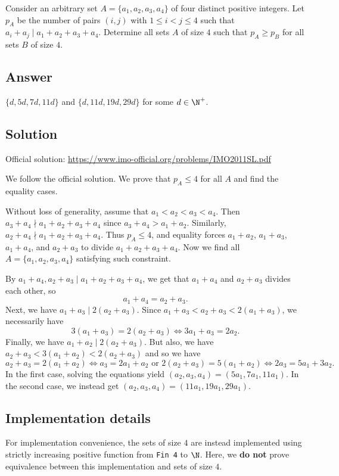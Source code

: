 Consider an arbitrary set $A = \{a_1, a_2, a_3, a_4\}$ of four distinct positive integers.
Let $p_A$ be the number of pairs $(i, j)$ with $1 \leq i < j \leq 4$ such that $a_i + a_j \mid a_1 + a_2 + a_3 + a_4$.
Determine all sets $A$ of size $4$ such that $p_A \geq p_B$ for all sets $B$ of size $4$.



\subsection*{Answer}

$\{d, 5d, 7d, 11d\}$ and $\{d, 11d, 19d, 29d\}$ for some $d \in \N^+$.



\subsection*{Solution}

Official solution: \url{https://www.imo-official.org/problems/IMO2011SL.pdf}

We follow the official solution.
We prove that $p_A \leq 4$ for all $A$ and find the equality cases.

Without loss of generality, assume that $a_1 < a_2 < a_3 < a_4$.
Then $a_3 + a_4 \nmid a_1 + a_2 + a_3 + a_4$ since $a_3 + a_4 > a_1 + a_2$.
Similarly, $a_2 + a_4 \nmid a_1 + a_2 + a_3 + a_4$.
Thus $p_A \leq 4$, and equality forces $a_1 + a_2$, $a_1 + a_3$, $a_1 + a_4$, and $a_2 + a_3$ to divide $a_1 + a_2 + a_3 + a_4$.
Now we find all $A = \{a_1, a_2, a_3, a_4\}$ satisfying such constraint.

By $a_1 + a_4, a_2 + a_3 \mid a_1 + a_2 + a_3 + a_4$, we get that $a_1 + a_4$ and $a_2 + a_3$ divides each other, so
\[ a_1 + a_4 = a_2 + a_3. \]
Next, we have $a_1 + a_3 \mid 2(a_2 + a_3)$.
Since $a_1 + a_3 < a_2 + a_3 < 2(a_1 + a_3)$, we necessarily have
\[ 3(a_1 + a_3) = 2(a_2 + a_3) \iff 3 a_1 + a_3 = 2 a_2. \]
Finally, we have $a_1 + a_2 \mid 2(a_2 + a_3)$.
But also, we have $a_2 + a_3 < 3 (a_1 + a_2) < 2(a_2 + a_3)$ and so we have
\[ a_2 + a_3 = 2(a_1 + a_2) \iff a_3 = 2 a_1 + a_2 \text{ or } 2(a_2 + a_3) = 5(a_1 + a_2) \iff 2 a_3 = 5 a_1 + 3 a_2. \]
In the first case, solving the equations yield $(a_2, a_3, a_4) = (5 a_1, 7 a_1, 11 a_1)$.
In the second case, we instead get $(a_2, a_3, a_4) = (11 a_1, 19 a_1, 29 a_1)$.





\subsection*{Implementation details}

For implementation convenience, the sets of size $4$ are instead implemented using strictly increasing positive function from \texttt{Fin 4} to $\N$.
Here, we \textbf{do not} prove equivalence between this implementation and sets of size $4$.
